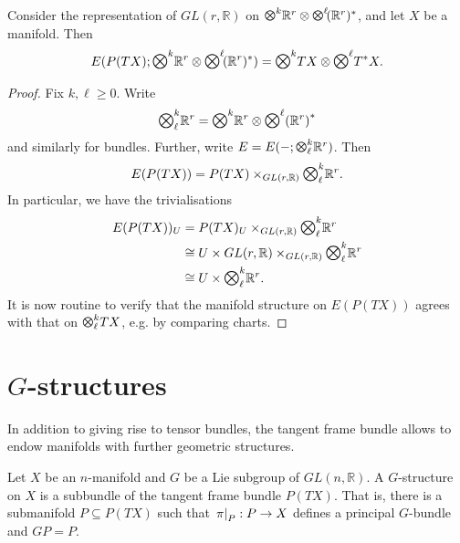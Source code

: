 \documentclass{article}
\begin{document}
\begin{theorem}
  Consider the representation of $GL(r,\mathbb{R})$ on
  $\tensor{}{k}{\mathbb{R}}^r\otimes\tensor{}{\ell}{(\mathbb{R}^r)^*}$,
  and let $X$ be a manifold. Then
  \begin{align*}
    E(P(TX);\tensor{}{k}{\mathbb{R}}^r\otimes\tensor{}{\ell}{(\mathbb{R}^r)^*}) = \tensor{}{k}{TX}\otimes\tensor{}{\ell}{T^*X}.
  \end{align*}
  \begin{proof}
    Fix $k,\ell\geq 0$. Write
    \begin{align*}
      \tensor{\ell}{k}{\mathbb{R}^r} = \tensor{}{k}{\mathbb{R}^r}\otimes\tensor{}{\ell}\left({\mathbb{R}^r}\right)^*
    \end{align*}
    and similarly for bundles. Further, write $E=E(-;\tensor{\ell}{k}\mathbb{R}^r)$. Then
    \begin{align*}
      E(P(TX)) = P(TX) \times_{GL(r,\mathbb{R})} \tensor{\ell}{k}{\mathbb{R}^r}.
    \end{align*}
    In particular, we have the trivialisations
    \begin{align*}
      E(P(TX))_U &=  P(TX)_U \times_{GL(r,\mathbb{R})} \tensor{\ell}{k}{\mathbb{R}^r}\\
                 &\cong U\times GL(r,\mathbb{R})\times_{GL(r,\mathbb{R})}\tensor{\ell}{k}{\mathbb{R}^r} \\
                 &\cong U\times \tensor{\ell}{k}{\mathbb{R}^r}.
    \end{align*}
    It is now routine to verify that the manifold structure on
    $E(P(TX))$ agrees with that on $\tensor{\ell}{k} TX$, e.g.
    by comparing charts.
  \end{proof}
\end{theorem}

\section{$G$-structures}

In addition to giving rise to tensor bundles, the tangent frame bundle
allows to endow manifolds with further geometric structures.

\begin{definition}
  Let $X$ be an $n$-manifold and $G$ be a Lie subgroup of $GL(n,\mathbb{R})$.
  A $G$-structure on $X$ is a subbundle of the tangent frame bundle
  $P(TX)$. That is, there is a submanifold $P\subseteq P(TX)$ such that
  $\left.{\pi}\right\vert_{P}:P\to X$ defines a principal $G$-bundle and $GP=P$.
\end{definition}
\end{document}
